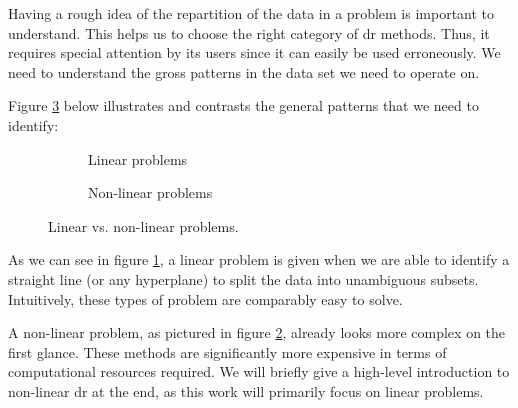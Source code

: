 Having a rough idea of the repartition of the data in a problem is important to understand.
This helps us to choose the right category of \gls{dr} methods.
Thus, it requires special attention by its users since it can easily be used erroneously.
We need to understand the gross patterns in the data set we need to operate on.
\bigskip

Figure \ref{fig:linearvsnonlinearproblems} below illustrates and contrasts the general patterns that we need to identify:%
\vspace*{2mm}

\renewcommand{\tikzscale}{1.2}
\begin{figure}[h]
	\begin{subfigure}{0.49\textwidth}
	    \caption{Linear problems}
		
	    \label{subfig:linearproblems}
	\end{subfigure}
	\hfill
	\begin{subfigure}{0.49\textwidth}
	    \caption{Non-linear problems}
		
	    \label{subfig:nonlinearproblems}
	\end{subfigure}
\caption{Linear vs. non-linear problems.}
\label{fig:linearvsnonlinearproblems}
\end{figure}
\bigskip

As we can see in figure \ref{subfig:linearproblems}, a linear problem is given when we are able to identify a straight line (or any \gls{hyperplane}) to split the data into unambiguous subsets.
Intuitively, these types of problem are comparably easy to solve.
\medskip

A non-linear problem, as pictured in figure \ref{subfig:nonlinearproblems}, already looks more complex on the first glance.
These methods are significantly more expensive in terms of computational resources required.
We will briefly give a high-level introduction to non-linear \acrlong{dr} at the end, as this work will primarily focus on linear problems.
